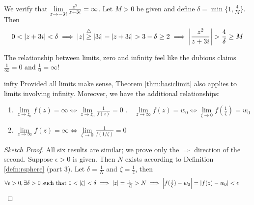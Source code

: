 \begin{example}{}{}
	We verify that $\smash{\lim\limits_{z\to -3i}}\,\frac{z^2}{z+3i}=\infty$. Let $M>0$ be given and define $\delta=\min\{1,\frac 4{M}\}$. Then
  \[
  	0<\nm{z+3i}<\delta \implies \nm z\overset{\triangle}{\ge} \nm{3i}-\nm{z+3i}>3-\delta\ge 2 \implies \nm{\frac{z^2}{z+3i}} > \frac{4}{\delta} \ge M
  \]
\end{example}


The relationship between limits, zero and infinity feel like the dubious claims $\frac 1\infty=0$ and $\frac 10=\infty$!

\begin{thm}{}{infty}
	Provided all limits make sense, Theorem \ref{thm:basiclimit} also applies to limits involving infinity. Moreover, we have the additional relationships:
	\begin{enumerate}
	  \item $\lim\limits_{z\to z_0}f(z)=\infty \iff \lim\limits_{z\to z_0}\frac 1{f(z)}=0$ \qquad{}.\ \ $\lim\limits_{z\to\infty}f(z)=w_0 \iff \lim\limits_{\zeta\to 0}f\left(\frac 1{\zeta}\right)=w_0$
	  \setcounter{enumi}{2}
	  \item $\lim\limits_{z\to \infty}f(z)=\infty \iff \lim\limits_{\zeta\to 0}\frac 1{f(1/\zeta)}=0$
	\end{enumerate}
\end{thm}

\begin{proof}[Sketch Proof]
	All six results are similar; we prove only the $\Rightarrow$ direction of the second. Suppose $\epsilon>0$ is given. Then $N$ exists according to Definition \ref{defn:rsphere} (part 3). Let $\delta=\frac 1N$ and $\zeta=\frac 1z$, then
	\[
		\forall \epsilon>0,\exists \delta>0\text{ such that }0< \left| \zeta\right|<\delta \implies \left| z\right| =\tfrac 1{\left| \zeta\right|}>N\implies \left| f(\tfrac 1\zeta)-w_0\right|=\left| f(z)-w_0\right|<\epsilon \tag*{\qedhere}
	\]
\end{proof}


